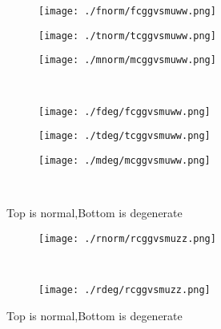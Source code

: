 \documentclass[aps,floats,floatfix,nofootinbib]{revtex4-1}
\begin{document}
\begin{center}
\begin{figure}
\begin{subfigure}{0.3\textwidth}
\texttt{[image: ./fnorm/fcggvsmuww.png]}
\label{}
\end{subfigure}
\begin{subfigure}{0.3\textwidth}
\texttt{[image: ./tnorm/tcggvsmuww.png]}
\label{}
\end{subfigure}
\begin{subfigure}{0.3\textwidth}
\texttt{[image: ./mnorm/mcggvsmuww.png]}
\label{}
\end{subfigure}\\
\begin{subfigure}{0.3\textwidth}
\texttt{[image: ./fdeg/fcggvsmuww.png]}
\label{}
\end{subfigure}
\begin{subfigure}{0.3\textwidth}
\texttt{[image: ./tdeg/tcggvsmuww.png]}
\label{}
\end{subfigure}
\begin{subfigure}{0.3\textwidth}
\texttt{[image: ./mdeg/mcggvsmuww.png]}
\label{}
\end{subfigure}\\
\caption{Top is normal,Bottom is degenerate}
\end{figure}
\end{center}

\begin{center}
\begin{figure}
\begin{subfigure}{1.0\textwidth}
\texttt{[image: ./rnorm/rcggvsmuzz.png]}
\label{}
\end{subfigure}\\
\begin{subfigure}{1.0\textwidth}
\texttt{[image: ./rdeg/rcggvsmuzz.png]}
\label{}
\end{subfigure}
\caption{Top is normal,Bottom is degenerate}
\end{figure}
\end{center}
\end{document}
